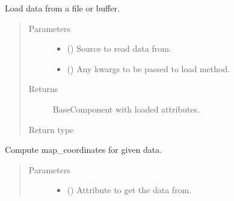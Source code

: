 \documentclass[letterpaper,10pt,english]{sphinxmanual}
\begin{document}
\begin{fulllineitems}
\begin{fulllineitems}
\label{\detokenize{api/states:geology.src.States.load}}
Load data from a file or buffer.
\begin{quote}\begin{description}
\item[{Parameters}] \leavevmode\begin{itemize}
\item {} 
 () \textendash{} Source to read data from.

\item {} 
 (\sphinxstyleliteralemphasis{\sphinxupquote{, }}) \textendash{} Any kwargs to be passed to load method.

\end{itemize}

\item[{Returns}] \leavevmode
{} \textendash{} BaseComponent with loaded attributes.

\item[{Return type}] \leavevmode
{\hyperref[\detokenize{api/base_classes:geology.src.base_component.BaseComponent}]{}}

\end{description}\end{quote}

\end{fulllineitems}


\begin{fulllineitems}
\label{\detokenize{api/states:geology.src.States.map_coordinates}}
Compute map\_coordinates for given data.
\begin{quote}\begin{description}
\item[{Parameters}] \leavevmode\begin{itemize}
\item {} 
 (\sphinxstyleliteralemphasis{\sphinxupquote{, }}) \textendash{} Attribute to get the data from.


\end{itemize}
\end{description}
\end{quote}
\end{fulllineitems}
\end{fulllineitems}
\end{document}
